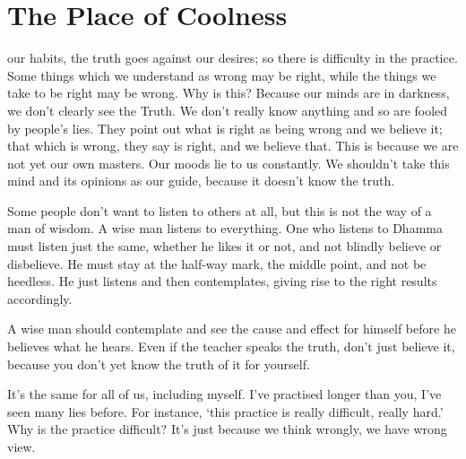 

\chapter{The Place of Coolness}

 our habits, the truth goes against our desires; so there is difficulty in the practice. Some things which we understand as wrong may be right, while the things we take to be right may be wrong. Why is this? Because our minds are in darkness, we don't clearly see the Truth. We don't really know anything and so are fooled by people's lies. They point out what is right as being wrong and we believe it; that which is wrong, they say is right, and we believe that. This is because we are not yet our own masters. Our moods lie to us constantly. We shouldn't take this mind and its opinions as our guide, because it doesn't know the truth.

Some people don't want to listen to others at all, but this is not the way of a man of wisdom. A wise man listens to everything. One who listens to Dhamma must listen just the same, whether he likes it or not, and not blindly believe or disbelieve. He must stay at the half-way mark, the middle point, and not be heedless. He just listens and then contemplates, giving rise to the right results accordingly.

A wise man should contemplate and see the cause and effect for himself before he believes what he hears. Even if the teacher speaks the truth, don't just believe it, because you don't yet know the truth of it for yourself.

It's the same for all of us, including myself. I've practised longer than you, I've seen many lies before. For instance, `this practice is really difficult, really hard.' Why is the practice difficult? It's just because we think wrongly, we have wrong view.

